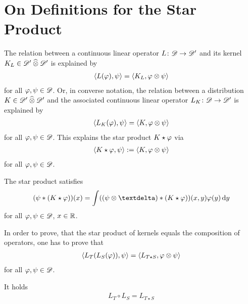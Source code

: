 \section{On Definitions for the Star Product}


The relation between a continuous linear operator
$ L \colon \mathscr{  D  } \to \mathscr{  D  }' $ and its kernel $ K_L \in \mathscr{  D  }' \mathbin{\widehat{\otimes}} \mathscr{  D  }' $
is explained by
\begin{align}
    \langle  L(\varphi)  ,  \psi  \rangle
    =
    \langle  K_L  ,  \varphi \otimes \psi  \rangle
\end{align}
for all $ \varphi,\psi \in \mathscr{  D  } $.
Or, in converse notation, the relation between a distribution
$ K \in \mathscr{  D  }' \mathbin{\widehat{\otimes}} \mathscr{  D  }' $ and the associated
continuous linear operator $ L_K \colon \mathscr{  D  } \to \mathscr{  D  }' $
is explained by
\begin{align}
    \langle  L_K( \varphi )  ,  \psi  \rangle
    =
    \langle  K  ,  \varphi \otimes \psi  \rangle
\end{align}
for all $ \varphi,\psi \in \mathscr{  D  } $.
This explains the star product $ K \star \varphi $ via
\begin{align}
    \langle  K \star \varphi  ,  \psi  \rangle
    :=
    \langle  K  ,  \varphi \otimes \psi  \rangle
\end{align}
for all $ \varphi,\psi \in \mathscr{  D  } $.

The star product satisfies
\begin{align}
    ( \ps * ( K \star \ph ) )( x )
    =
    \int ( ( \ps \tepro \sfdeo ) * ( K \star \ph ) )(x,y) \ph(y) \intd{y}
\end{align}
for all $ \varphi,\psi \in \mathscr{  D  } $, $ x \in \mathbb{ R } $.

In order to prove, that the star product of kernels
equals the composition of operators,
one has to prove that
\begin{align}
    \langle  L_T( L_S( \varphi ) )  ,  \psi  \rangle
    =
    \langle  L_{T\star S}  ,  \varphi \otimes \psi  \rangle
\end{align}
for all $ \varphi,\psi \in \mathscr{  D  } $.

It holds
\begin{align}
    L_T \circ L_S
    =
    L_{T \star S}
\end{align}


